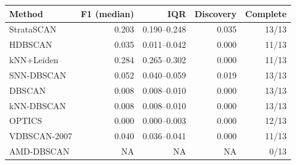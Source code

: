 \begin{tabular}{lrrrr}
\toprule
Method & F1 (median) & IQR & Discovery & Complete \\
\midrule
StrataSCAN & 0.203 & 0.190--0.248 & 0.035 & 13/13 \\
HDBSCAN & 0.035 & 0.011--0.042 & 0.000 & 11/13 \\
kNN+Leiden & 0.284 & 0.265--0.302 & 0.000 & 11/13 \\
SNN-DBSCAN & 0.052 & 0.040--0.059 & 0.019 & 13/13 \\
DBSCAN & 0.008 & 0.008--0.010 & 0.000 & 13/13 \\
kNN-DBSCAN & 0.008 & 0.008--0.010 & 0.000 & 13/13 \\
OPTICS & 0.000 & 0.000--0.003 & 0.000 & 12/13 \\
VDBSCAN-2007 & 0.040 & 0.036--0.041 & 0.000 & 11/13 \\
AMD-DBSCAN & NA & NA & NA & 0/13 \\
\bottomrule
\end{tabular}
